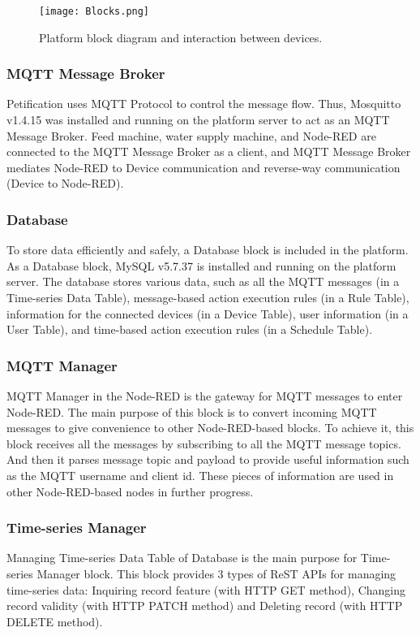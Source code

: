 \documentclass[conference]{IEEEtran}
\begin{document}
\begin{figure}[htbp]
\centerline{\texttt{[image: Blocks.png]}}
\caption{Platform block diagram and interaction between devices.}
\label{fig}
\end{figure}

\subsubsection{MQTT Message Broker}
\hfill \break Petification uses MQTT Protocol to control the message flow. Thus, Mosquitto v1.4.15 was installed and running on the platform server to act as an MQTT Message Broker. Feed machine, water supply machine, and Node-RED are connected to the MQTT Message Broker as a client, and MQTT Message Broker mediates Node-RED to Device communication and reverse-way communication (Device to Node-RED).

\subsubsection{Database}
\hfill \break To store data efficiently and safely, a Database block is included in the platform. As a Database block, MySQL v5.7.37 is installed and running on the platform server. The database stores various data, such as all the MQTT messages (in a Time-series Data Table), message-based action execution rules (in a Rule Table), information for the connected devices (in a Device Table), user information (in a User Table), and time-based action execution rules (in a Schedule Table).

\subsubsection{MQTT Manager}
\hfill \break MQTT Manager in the Node-RED is the gateway for MQTT messages to enter Node-RED. The main purpose of this block is to convert incoming MQTT messages to give convenience to other Node-RED-based blocks. To achieve it, this block receives all the messages by subscribing to all the MQTT message topics. And then it parses message topic and payload to provide useful information such as the MQTT username and client id. These pieces of information are used in other Node-RED-based nodes in further progress.

\subsubsection{Time-series Manager}
\hfill \break Managing Time-series Data Table of Database is the main purpose for Time-series Manager block. This block provides 3 types of ReST APIs for managing time-series data: Inquiring record feature (with HTTP GET method), Changing record validity (with HTTP PATCH method) and Deleting record (with HTTP DELETE method). 
\end{document}
